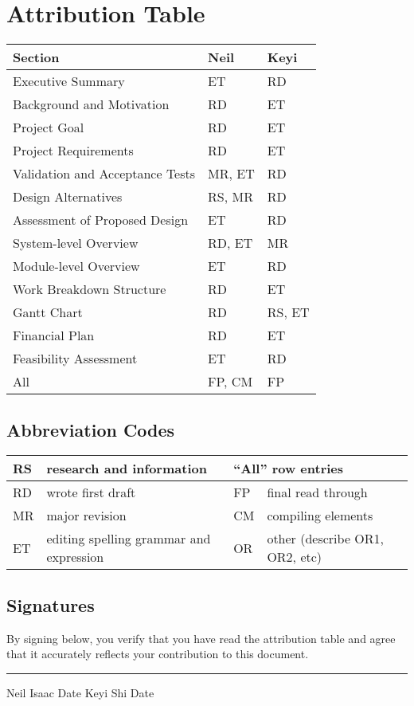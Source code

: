 \thispagestyle{empty}

\section*{Attribution Table}

{\footnotesize
\begin{tabular}{|l|l|l|}
	\hline
	\textbf{Section} & \textbf{Neil} & \textbf{Keyi} \\
	\hline \hline
	Executive Summary & ET & RD \\
	\hline
	Background and Motivation & RD & ET \\
	Project Goal & RD & ET \\
	Project Requirements & RD & ET \\
	Validation and Acceptance Tests & MR, ET & RD \\
	\hline
	Design Alternatives & RS, MR & RD \\
	Assessment of Proposed Design & ET & RD \\
	System-level Overview & RD, ET & MR \\
	Module-level Overview & ET & RD \\
	\hline
	Work Breakdown Structure & RD & ET \\
	Gantt Chart & RD & RS, ET \\
	Financial Plan & RD & ET \\
	Feasibility Assessment & ET & RD \\
	\hline
	All & FP, CM & FP \\
	\hline
\end{tabular}
}

\subsection*{Abbreviation Codes}

{\footnotesize
\begin{tabular}[width=7in]{|l|l||l|l|}
	\hline
	RS & research and information & \multicolumn{2}{l|}{``All'' row entries} \\ \hline
	RD & wrote first draft & FP & final read through \\ \hline
	MR & major revision & CM & compiling elements \\ \hline
	ET & editing spelling grammar and expression & OR & other (describe OR1, OR2, etc) \\ \hline
\end{tabular}
}

\subsection*{Signatures}

By signing below, you verify that you have read the attribution table and agree that it accurately reflects your contribution to this document.

\vfill

\hrule
Neil Isaac \hspace{1in} Date \hspace{1in} Keyi Shi \hspace{1in} Date

